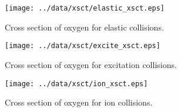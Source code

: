 \begin{figure}[htbp]
    \centering
    \texttt{[image: ../data/xsct/elastic\_xsct.eps]}
    \caption{Cross section of oxygen for elastic collisions.}
    \label{fig:coll_elastic}
\end{figure}



\begin{figure}[htbp]
    \centering
    \texttt{[image: ../data/xsct/excite\_xsct.eps]}
    \caption{Cross section of oxygen for excitation collisions.}
    \label{fig:coll_elastic}
\end{figure}

\begin{figure}[htbp]
    \centering
    \texttt{[image: ../data/xsct/ion\_xsct.eps]}
    \caption{Cross section of oxygen for ion collisions.}
    \label{fig:coll_neg}
\end{figure}


